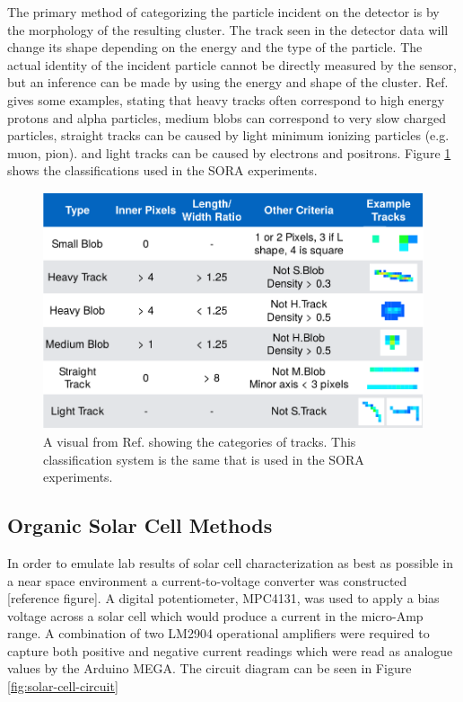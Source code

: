 The primary method of categorizing the particle incident on the detector is by the morphology of the resulting cluster.
The track seen in the detector data will change its shape depending on the energy and the type of the particle.
The actual identity of the incident particle cannot be directly measured by the sensor, but an inference can be made by using the energy and shape of the cluster. Ref. \cite{Stuart-Thesis} gives some examples, stating that heavy tracks often correspond to high energy protons and alpha particles, medium blobs can correspond to very slow charged particles, straight tracks can be caused by light minimum ionizing particles (e.g. muon, pion). and light tracks can be caused by electrons and positrons.     
Figure \ref{fig:stuart-track-types} shows the classifications used in the SORA experiments.
\begin{figure}[h!]
	\begin{center}
		\includegraphics[width=\textwidth]{figures/stuart-track-types.pdf}
		\caption{A visual from Ref. \cite{Stuart-Thesis} showing the categories of tracks. This classification system is the same that is used in the SORA experiments.}
		\label{fig:stuart-track-types}
	\end{center}
\end{figure}

\subsection{Organic Solar Cell Methods}
\label{sec:Solar-Cell-Methods}

In order to emulate lab results of solar cell characterization as best as possible in a near space environment a current-to-voltage converter was constructed [reference figure]. A digital potentiometer, MPC4131, was used to apply a bias voltage across a solar cell which would produce a current in the micro-Amp range. A combination of two LM2904 operational amplifiers were required to capture both positive and negative current readings which were read as analogue values by the Arduino MEGA. The circuit diagram can be seen in Figure \ref{fig:solar-cell-circuit}

